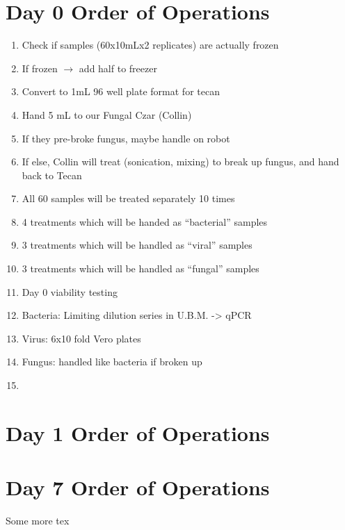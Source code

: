 \documentclass{article}
\begin{document}
\newpage
\section*{Day 0 Order of Operations} \label{day0instructions}

\begin{enumerate}
    \item Check if samples (60x10mLx2 replicates) are actually frozen
    \item If frozen $\rightarrow$ add half to freezer
    \item Convert to 1mL 96 well plate format for tecan
    \item Hand 5 mL to our Fungal Czar (Collin)
    \item If they pre-broke fungus, maybe handle on robot
    \item If else, Collin will treat (sonication, mixing) to break up fungus, and hand back to Tecan
    \item All 60 samples will be treated separately 10 times
    \item 4 treatments which will be handed as “bacterial” samples
    \item 3 treatments which will be handled as “viral” samples
    \item 3 treatments which will be handled as “fungal” samples
    \item Day 0 viability testing
    \item Bacteria: Limiting dilution series in U.B.M. -> qPCR
    \item Virus: 6x10 fold Vero plates 
    \item Fungus: handled like bacteria if broken up
    \item 
\end{enumerate}

\section*{Day 1 Order of Operations} \label{day1instructions}


\section*{Day 7 Order of Operations} \label{day7instructions}


Some more tex
\end{document}
